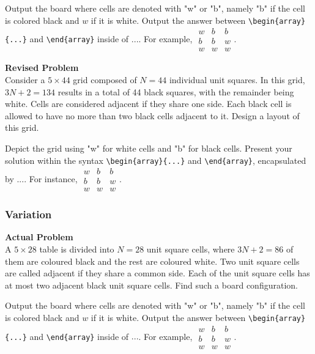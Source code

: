 Output the board where cells are denoted with "w" or "b", namely "b" if the cell is colored black and $w$ if it is white. Output the answer between \verb|\begin{array}{...}| and \verb|\end{array}| inside of $\boxed{...}$. For example, $\boxed{\begin{array}{ccc}w & b & b \\ b & b & w \\ w & w & w\end{array}}$.

\textbf{Revised Problem}\\
Consider a $5 \times 44$ grid composed of $N=44$ individual unit squares. In this grid, $3N + 2 = 134$ results in a total of 44 black squares, with the remainder being white. Cells are considered adjacent if they share one side. Each black cell is allowed to have no more than two black cells adjacent to it. Design a layout of this grid.

Depict the grid using "w" for white cells and "b" for black cells. Present your solution within the syntax \verb|\begin{array}{...}| and \verb|\end{array}|, encapsulated by $\boxed{...}$. For instance, $\boxed{\begin{array}{ccc}w & b & b \\ b & b & w \\ w & w & w\end{array}}$.

\subsubsection{Variation}
\textbf{Actual Problem}\\
A $5 \times 28$ table is divided into $N=28$ unit square cells, where $3N+2=86$ of them are coloured black and the rest are coloured white. Two unit square cells are called adjacent if they share a common side. Each of the unit square cells has at most two adjacent black unit square cells. Find such a board configuration.

Output the board where cells are denoted with "w" or "b", namely "b" if the cell is colored black and $w$ if it is white. Output the answer between \verb|\begin{array}{...}| and \verb|\end{array}| inside of $\boxed{...}$. For example, $\boxed{\begin{array}{ccc}w & b & b \\ b & b & w \\ w & w & w\end{array}}$.

